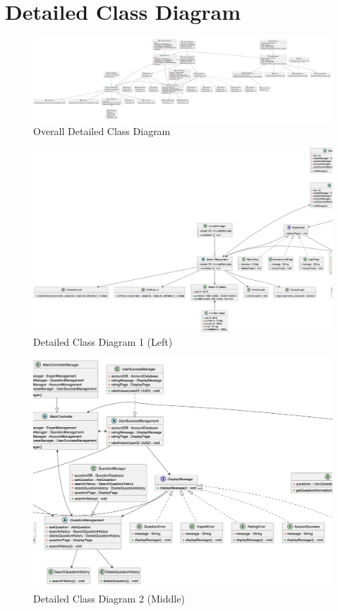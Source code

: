\documentclass[]{article}
\numberwithin{figure}{section}
\begin{document}
\clearpage
\section{Detailed Class Diagram}
\label{sec:detailed_class_diagram}
\begin{figure}[h]
    \centering
    \includegraphics[width=1\textwidth]{diagrams/classdiagram.png} %
    \caption{Overall Detailed Class Diagram}
\end{figure}

\begin{figure}[h]
    \centering
    \includegraphics[width=1\textwidth]{diagrams/left.png} %
    \caption{Detailed Class Diagram 1 (Left)\\}
\end{figure}

\begin{figure}[h]
    \centering
    \includegraphics[width=1\textwidth]{diagrams/middle.png} %
    \caption{Detailed Class Diagram 2 (Middle)\\}
\end{figure}
\end{document}

